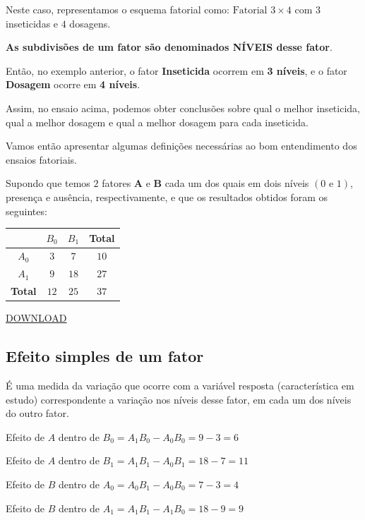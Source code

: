 \documentclass[
]{article}
\begin{document}
Neste caso, representamos o esquema fatorial como:
\(\text{Fatorial }3 \times 4\) com \(3\) inseticidas e \(4\) dosagens.

\textbf{As subdivisões de um fator são denominados NÍVEIS desse fator}.

Então, no exemplo anterior, o fator \textbf{Inseticida} ocorrem em
\textbf{3 níveis}, e o fator \textbf{Dosagem} ocorre em \textbf{4
níveis}.

Assim, no ensaio acima, podemos obter conclusões sobre qual o melhor
inseticida, qual a melhor dosagem e qual a melhor dosagem para cada
inseticida.

Vamos então apresentar algumas definições necessárias ao bom
entendimento dos ensaios fatoriais.

Supondo que temos \(2\) fatores \textbf{A} e \textbf{B} cada um dos
quais em dois níveis \((0 \text{ e } 1)\), presença e ausência,
respectivamente, e que os resultados obtidos foram os seguintes:

\begin{longtable}[]{@{}cccc@{}}
\toprule\noalign{}
& \(B_0\) & \(B_1\) & Total \\
\midrule\noalign{}
\endhead
\bottomrule\noalign{}
\endlastfoot
\(A_0\) & \(3\) & \(7\) & \(10\) \\
\(A_1\) & \(9\) & \(18\) & \(27\) \\
\textbf{Total} & \(12\) & \(25\) & \(37\) \\
\end{longtable}

\href{https://github.com/arpanosso/experimentacao-agricola-unesp-fcav/raw/master/data/interação.xlsx}{DOWNLOAD}

\subsection{Efeito simples de um
fator}\label{efeito-simples-de-um-fator}

É uma medida da variação que ocorre com a variável resposta
(característica em estudo) correspondente a variação nos níveis desse
fator, em cada um dos níveis do outro fator.

Efeito de \(A\) dentro de \(B_0 = A_1B_0-A_0B_0 = 9 -3 = 6\)

Efeito de \(A\) dentro de \(B_1 = A_1B_1-A_0B_1 = 18-7 = 11\)

Efeito de \(B\) dentro de \(A_0 = A_0B_1-A_0B_0=7-3=4\)

Efeito de \(B\) dentro de \(A_1 = A_1B_1-A_1B_0 = 18-9=9\)
\end{document}
